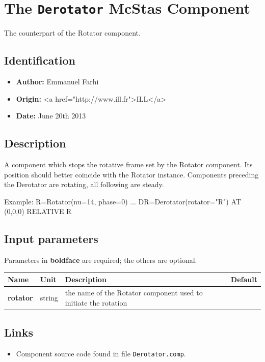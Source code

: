 \section{The \texttt{Derotator} McStas Component}
The counterpart of the Rotator component.

\subsection*{Identification}
\begin{itemize}
  \item \textbf{Author:} Emmanuel Farhi
  \item \textbf{Origin:} \textless{}a href="http://www.ill.fr"\textgreater{}ILL\textless{}/a\textgreater{}
  \item \textbf{Date:} June 20th 2013
\end{itemize}

\subsection*{Description}
A component which stops the rotative frame set by the Rotator component. Its position should better coincide with the Rotator instance. Components preceding the Derotator are rotating, all following are steady.

Example: R=Rotator(nu=14, phase=0) ... DR=Derotator(rotator="R") AT (0,0,0) RELATIVE R

\subsection*{Input parameters}
Parameters in \textbf{boldface} are required; the others are optional.

\begin{longtable}{p{}p{}p{}p{}}
\toprule
\textbf{Name} & \textbf{Unit} & \textbf{Description} & \textbf{Default} \\
\midrule
\endhead
\textbf{rotator} & string & the name of the Rotator component used to initiate the rotation &  \\
\bottomrule
\end{longtable}

\subsection*{Links}
\begin{itemize}
  \item Component source code found in file \texttt{Derotator.comp}.
\end{itemize}
